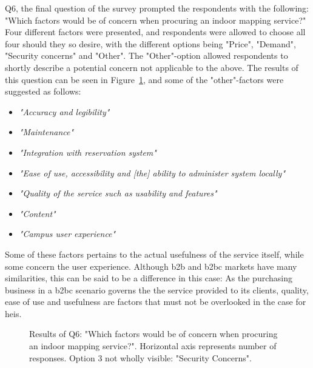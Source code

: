 Q6, the final question of the survey prompted the respondents with the following: "Which factors would be of concern when procuring an indoor mapping service?" Four different factors were presented, and respondents were allowed to choose all four should they so desire, with the different options being "Price", "Demand", "Security concerns" and "Other". The "Other"-option allowed respondents to shortly describe a potential concern not applicable to the above. The results of this question can be seen in Figure~\ref{fig:q6}, and some of the "other"-factors were suggested as follows:
\begin{itemize}
    \item \textit{"Accuracy and legibility"}
    \item \textit{"Maintenance"}
    \item \textit{"Integration with reservation system"}
    \item \textit{"Ease of use, accessibility and [the] ability to administer system locally"}
    \item \textit{"Quality of the service such as usability and features"}
    \item \textit{"Content"}
    \item \textit{"Campus user experience"}
\end{itemize}

Some of these factors pertains to the actual usefulness of the service itself, while some concern the user experience. Although \gls{b2b} and \gls{b2bc} markets have many similarities, this can be said to be a difference in this case: As the purchasing business in a \gls{b2bc} scenario governs the the service provided to its clients, quality, ease of use and usefulness are factors that must not be overlooked in the case for \glspl{hei}.



\begin{figure}[H]
    \centering
    \caption{Results of Q6: "Which factors would be of concern when procuring an indoor mapping service?". Horizontal axis represents number of responses. Option 3 not wholly visible: "Security Concerns".}
    \label{fig:q6}
\end{figure}


